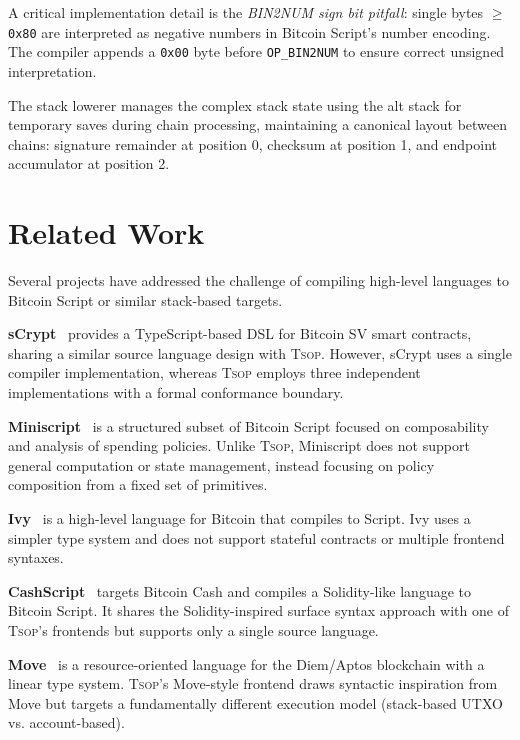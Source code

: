 \documentclass[11pt,a4paper]{article}
\newcommand{\op}[1]{\texttt{OP\_#1}}
\newcommand{\tsop}{\textsc{Tsop}}
\begin{document}
A critical implementation detail is the \emph{BIN2NUM sign bit pitfall}:
single bytes $\geq$ \texttt{0x80} are interpreted as negative numbers in
Bitcoin Script's number encoding. The compiler appends a \texttt{0x00} byte
before \op{BIN2NUM} to ensure correct unsigned interpretation.

The stack lowerer manages the complex stack state using the alt stack for
temporary saves during chain processing, maintaining a canonical layout
between chains: signature remainder at position 0, checksum at position 1,
and endpoint accumulator at position 2.

\section{Related Work}
\label{sec:related}

Several projects have addressed the challenge of compiling high-level
languages to Bitcoin Script or similar stack-based targets.

\textbf{sCrypt}~\cite{scrypt} provides a TypeScript-based DSL for Bitcoin SV
smart contracts, sharing a similar source language design with \tsop{}.
However, sCrypt uses a single compiler implementation, whereas \tsop{}
employs three independent implementations with a formal conformance boundary.

\textbf{Miniscript}~\cite{miniscript} is a structured subset of Bitcoin
Script focused on composability and analysis of spending policies. Unlike
\tsop{}, Miniscript does not support general computation or state management,
instead focusing on policy composition from a fixed set of primitives.

\textbf{Ivy}~\cite{ivy} is a high-level language for Bitcoin that compiles
to Script. Ivy uses a simpler type system and does not support stateful
contracts or multiple frontend syntaxes.

\textbf{CashScript}~\cite{cashscript} targets Bitcoin Cash and compiles
a Solidity-like language to Bitcoin Script. It shares the Solidity-inspired
surface syntax approach with one of \tsop{}'s frontends but supports only a
single source language.

\textbf{Move}~\cite{move} is a resource-oriented language for the Diem/Aptos
blockchain with a linear type system. \tsop{}'s Move-style frontend draws
syntactic inspiration from Move but targets a fundamentally different
execution model (stack-based UTXO vs. account-based).
\end{document}
